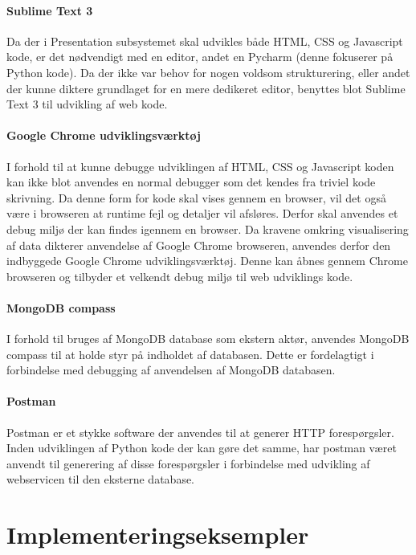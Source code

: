 \begin{appendices}
\subsubsection{Sublime Text 3}
Da der i Presentation subsystemet skal udvikles både HTML, CSS og Javascript kode, er det nødvendigt med en editor, andet en Pycharm (denne fokuserer på Python kode). Da der ikke var behov for nogen voldsom strukturering, eller andet der kunne diktere grundlaget for en mere dedikeret editor, benyttes blot Sublime Text 3 til udvikling af web kode.

\subsubsection{Google Chrome udviklingsværktøj}
I forhold til at kunne debugge udviklingen af HTML, CSS og Javascript koden kan ikke blot anvendes en normal debugger som det kendes fra triviel kode skrivning. Da denne form for kode skal vises gennem en browser, vil det også være i browseren at runtime fejl og detaljer vil afsløres. Derfor skal anvendes et debug miljø der kan findes igennem en browser. Da kravene omkring visualisering af data dikterer anvendelse af Google Chrome browseren, anvendes derfor den indbyggede Google Chrome udviklingsværktøj. Denne kan åbnes gennem Chrome browseren og tilbyder et velkendt debug miljø til web udviklings kode. 

\subsubsection{MongoDB compass}
I forhold til bruges af MongoDB database som ekstern aktør, anvendes MongoDB compass til at holde styr på indholdet af databasen. Dette er fordelagtigt i forbindelse med debugging af anvendelsen af MongoDB databasen.

\subsubsection{Postman}
Postman er et stykke software der anvendes til at generer HTTP forespørgsler. Inden udviklingen af Python kode der kan gøre det samme, har postman været anvendt til generering af disse forespørgsler i forbindelse med udvikling af webservicen til den eksterne database. 

\pagebreak

\chapter{Implementeringseksempler} \label{appendix::implementeringseksempler}


\end{appendices}
